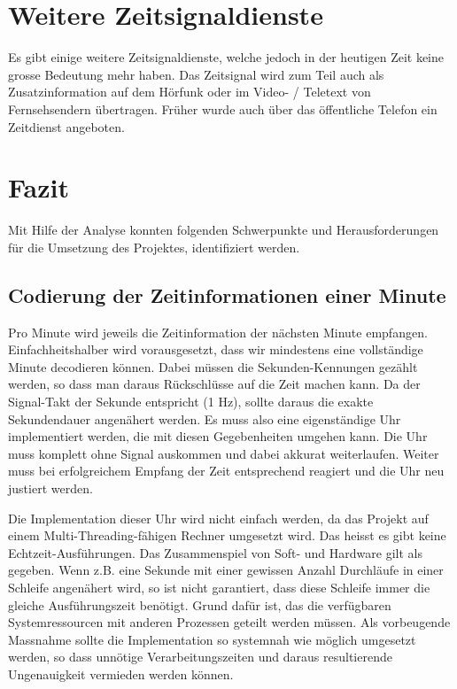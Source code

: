 \section{Weitere Zeitsignaldienste}
Es gibt einige weitere Zeitsignaldienste, welche jedoch in der heutigen Zeit keine grosse Bedeutung mehr haben. Das Zeitsignal wird zum Teil auch als Zusatzinformation auf dem Hörfunk oder im Video- / Teletext von Fernsehsendern übertragen. Früher wurde auch über das öffentliche Telefon ein Zeitdienst angeboten.

\section{Fazit}
Mit Hilfe der Analyse konnten folgenden Schwerpunkte und Herausforderungen für die Umsetzung des Projektes, identifiziert werden.

\subsection{Codierung der Zeitinformationen einer Minute}
Pro Minute wird jeweils die Zeitinformation der nächsten Minute empfangen.
Einfachheitshalber wird vorausgesetzt, dass wir mindestens eine vollständige Minute decodieren können.
Dabei müssen die Sekunden-Kennungen gezählt werden, so dass man daraus Rückschlüsse auf die Zeit machen kann.
Da der Signal-Takt der Sekunde entspricht (1 Hz), sollte daraus die exakte Sekundendauer angenähert werden.
Es muss also eine eigenständige Uhr implementiert werden, die mit diesen Gegebenheiten umgehen kann.
Die Uhr muss komplett ohne Signal auskommen und dabei akkurat weiterlaufen. Weiter muss bei erfolgreichem Empfang der Zeit entsprechend reagiert und die Uhr neu justiert werden.

Die Implementation dieser Uhr wird nicht einfach werden, da das Projekt auf einem Multi-Threading-fähigen Rechner umgesetzt wird. Das heisst es gibt keine Echtzeit-Ausführungen.
Das Zusammenspiel von Soft- und Hardware gilt als gegeben.
Wenn z.B. eine Sekunde mit einer gewissen Anzahl Durchläufe in einer Schleife angenähert wird, so ist nicht garantiert, dass diese Schleife immer die gleiche Ausführungszeit benötigt.
Grund dafür ist, das die verfügbaren Systemressourcen mit anderen Prozessen geteilt werden müssen.
Als vorbeugende Massnahme sollte die Implementation so systemnah wie möglich umgesetzt werden, so dass unnötige Verarbeitungszeiten und daraus resultierende Ungenauigkeit vermieden werden können.

